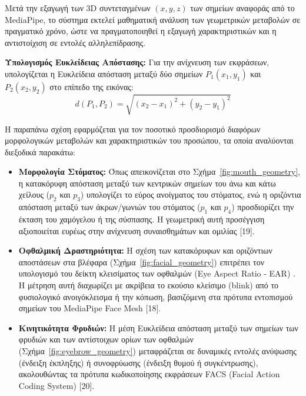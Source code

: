 \documentclass[twoside, a4paper, 11pt]{article}
\newcommand{\textlatin}[1]{\textenglish{#1}}
\begin{document}
Μετά την εξαγωγή των 3D συντεταγμένων $(x, y, z)$ των σημείων αναφοράς από το \textlatin{MediaPipe}, το σύστημα εκτελεί μαθηματική ανάλυση των γεωμετρικών μεταβολών σε πραγματικό χρόνο, ώστε να πραγματοποιηθεί η εξαγωγή χαρακτηριστικών και η αντιστοίχιση σε εντολές αλληλεπίδρασης.

\smallskip
\noindent\textbf{Υπολογισμός Ευκλείδειας Απόστασης:} Για την ανίχνευση των εκφράσεων, υπολογίζεται η Ευκλείδεια απόσταση μεταξύ δύο σημείων $P_1(x_1, y_1)$ και $P_2(x_2, y_2)$ στο επίπεδο της εικόνας:
\begin{equation}
d(P_1, P_2) = \sqrt{(x_2 - x_1)^2 + (y_2 - y_1)^2}
\end{equation}

Η παραπάνω σχέση εφαρμόζεται για τον ποσοτικό προσδιορισμό διαφόρων μορφολογικών μεταβολών και χαρακτηριστικών του προσώπου, τα οποία αναλύονται διεξοδικά παρακάτω:

\begin{itemize}
    \item \textbf{Μορφολογία Στόματος:} Όπως απεικονίζεται στο Σχήμα~\ref{fig:mouth_geometry}, η κατακόρυφη απόσταση μεταξύ των κεντρικών σημείων του άνω και κάτω χείλους ($p_2$ και $p_3$) υπολογίζει το εύρος ανοίγματος του στόματος, ενώ η οριζόντια απόσταση μεταξύ των άκρων/γωνιών του στόματος ($p_1$ και $p_4$) προσδιορίζει την έκταση του χαμόγελου ή της σύσπασης. Η γεωμετρική αυτή προσέγγιση αξιοποιείται ευρέως στην ανίχνευση συναισθημάτων και ομιλίας [19].
    
    \item \textbf{Οφθαλμική Δραστηριότητα:} Η σχέση των κατακόρυφων και οριζόντιων αποστάσεων στα βλέφαρα (Σχήμα~\ref{fig:facial_geometry}) επιτρέπει τον υπολογισμό του δείκτη κλεισίματος των οφθαλμών (\textlatin{Eye Aspect Ratio - EAR}) \cite{soukupova2016real}. Η μέτρηση αυτή διαχωρίζει με ακρίβεια το εκούσιο κλείσιμο (\textlatin{blink}) από το φυσιολογικό ανοιγόκλεισμα ή την κόπωση, βασιζόμενη στα πρότυπα εντοπισμού σημείων του \textlatin{MediaPipe Face Mesh} [18].
    
    \item \textbf{Κινητικότητα Φρυδιών:} Η μέση Ευκλείδεια απόσταση μεταξύ των σημείων των φρυδιών και των αντίστοιχων ορίων των οφθαλμών (Σχήμα~\ref{fig:eyebrow_geometry}) μεταφράζεται σε δυναμικές εντολές ανύψωσης (ένδειξη έκπληξης) ή συνοφρύωσης (ένδειξη θυμού ή συγκέντρωσης), ακολουθώντας τα πρότυπα κωδικοποίησης εκφράσεων \textlatin{FACS} (\textlatin{Facial Action Coding System}) [20].
\end{itemize}
\end{document}
